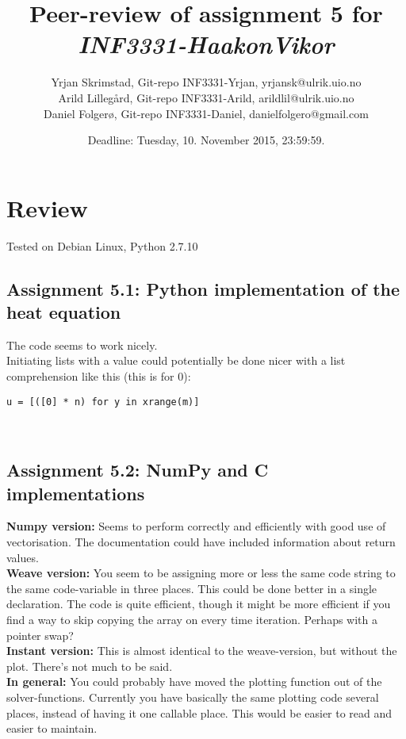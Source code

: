 \documentclass[a4paper]{article}
\title{Peer-review of assignment 5 for \textit{INF3331-HaakonVikor}}
\author{Yrjan Skrimstad, Git-repo INF3331-Yrjan, {yrjansk@ulrik.uio.no} \\
        Arild Lillegård, Git-repo INF3331-Arild, {arildlil@ulrik.uio.no} \\
        Daniel Folgerø, Git-repo INF3331-Daniel, {danielfolgero@gmail.com}}
\date{Deadline: Tuesday, 10. November 2015, 23:59:59.}
\begin{document}
\maketitle
\section{Review}\label{sec:review}

Tested on Debian Linux, Python 2.7.10

\subsection*{Assignment 5.1:  Python implementation of the heat equation}
The code seems to work nicely.\\
Initiating lists with a value could potentially be done nicer with a list comprehension like this (this is for 0):

\begin{verbatim}
u = [([0] * n) for y in xrange(m)]
\end{verbatim}
\\

\subsection*{Assignment 5.2: NumPy and C implementations} \label{sec:assignment5.2}
\textbf{Numpy version:}
Seems to perform correctly and efficiently with good use of vectorisation. The documentation could have included information about return values.
\\
\noindent\textbf{Weave version:}
You seem to be assigning more or less the same code string to the same code-variable in three places. This could be done better in a single declaration. The code is quite efficient, though it might be more efficient if you find a way to skip copying the array on every time iteration. Perhaps with a pointer swap?
\\
\noindent\textbf{Instant version:}
This is almost identical to the weave-version, but without the plot. There's not much to be said.
\\
\noindent\textbf{In general:}
You could probably have moved the plotting function out of the solver-functions. Currently you have basically the same plotting code several places, instead of having it one callable place. This would be easier to read and easier to maintain.
\end{document}
